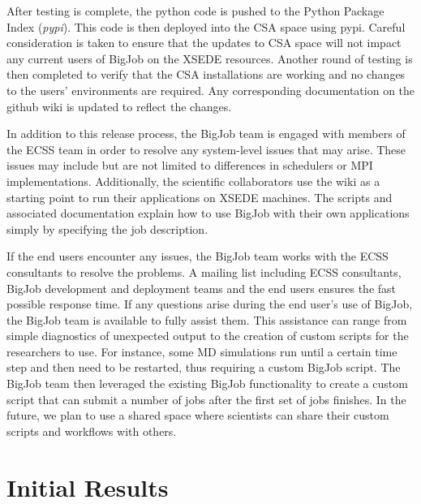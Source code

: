\documentclass{sig-alternate}
\begin{document}
After testing is complete, the python code is pushed to the Python Package Index
(\textit{pypi}). This code is then deployed into the CSA space using pypi.
Careful consideration is taken to ensure that the updates to CSA space
will not impact any current users of BigJob on the XSEDE resources. Another round of testing 
is then completed to verify that the CSA installations are working and no changes to 
the users' environments are required. Any corresponding documentation on the 
github wiki is updated to reflect the changes.

In addition to this release process, the BigJob team is engaged with members
of the ECSS team in order to resolve any system-level issues that may arise.
These issues may include but are not limited to differences in schedulers or MPI
implementations. Additionally, the scientific collaborators use the wiki as a
starting point to run their applications on XSEDE machines. The scripts and
associated documentation explain how to use BigJob with their own applications
simply by specifying the job description. 

If the end users encounter any issues, the BigJob team works with the ECSS
consultants to resolve the problems. A mailing list including ECSS consultants,
BigJob development and deployment teams and the end users ensures the fast
possible response time. If any questions arise during the end user's use of
BigJob, the BigJob team is available to fully assist them. This assistance can
range from simple diagnostics of unexpected output to  the creation of
custom scripts for the researchers to use. For instance, some MD simulations
run until a certain time step and then need to be restarted, thus requiring a
custom BigJob script. The BigJob team then leveraged the existing BigJob
functionality to create a custom script that can submit a number of jobs after
the first set of jobs finishes. In the future, we plan to use a shared space
where scientists can share their custom scripts and workflows with others.

\section{Initial Results} 

\end{document}
